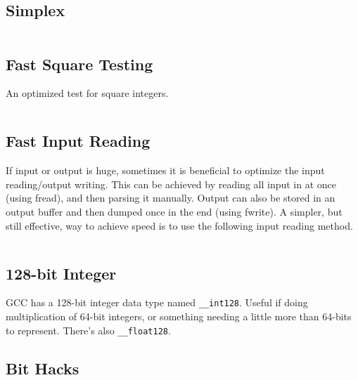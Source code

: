 \documentclass[8pt,a4paper,landscape,oneside]{amsart}
\newcommand{\code}[1]{\inputminted[fontsize=\normalsize,baselinestretch=1]{cpp}{_code/#1}}
\begin{document}
\begin{multicols*}{3}
  \subsection{Simplex}
    \code{other/simplex.cpp}
  \subsection{Fast Square Testing}
    An optimized test for square integers.
    \code{tricks/is_square.cpp}
  \subsection{Fast Input Reading}
    If input or output is huge, sometimes it is beneficial to optimize the
    input reading/output writing. This can be achieved by reading all input
    in at once (using fread), and then parsing it manually. Output can also
    be stored in an output buffer and then dumped once in the end (using
    fwrite). A simpler, but still effective, way to achieve speed is to use
    the following input reading method.
    \code{tricks/fast_input.cpp}
  \subsection{128-bit Integer}
    GCC has a 128-bit integer data type named \texttt{\_\_int128}. Useful
    if doing multiplication of 64-bit integers, or something needing a
    little more than 64-bits to represent. There's also
    \texttt{\_\_float128}.
  \subsection{Bit Hacks}
    \code{tricks/snoob.cpp}
\newpage

\end{multicols*}
\end{document}
